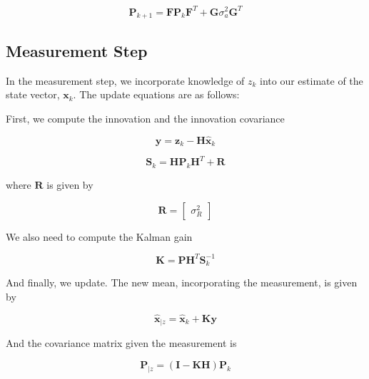 \documentclass{article}
\begin{document}
\begin{equation}
\mathbf{P}_{k+1} = \mathbf{F} \mathbf{P}_k \mathbf{F}^T + \mathbf{G} \sigma_a^2 \mathbf{G}^T
\end{equation}

\subsection{Measurement Step}

In the measurement step, we incorporate knowledge of $z_k$ into our estimate of the state vector, $\mathbf{x}_k$.
The update equations are as follows:

First, we compute the innovation and the innovation covariance

\begin{equation}
\mathbf{y} = \mathbf{z}_k - \mathbf{H}\hat{\mathbf{x}}_k
\end{equation}

\begin{equation}
\mathbf{S}_k = \mathbf{H}\mathbf{P}_k\mathbf{H}^T + \mathbf{R}
\end{equation}

where $\mathbf{R}$ is given by

\[
\mathbf{R} =
\begin{bmatrix}
\sigma_R^2
\end{bmatrix}
\]

We also need to compute the Kalman gain

\begin{equation}
\mathbf{K} = \mathbf{P}\mathbf{H}^T\mathbf{S}_k^{-1}
\end{equation}

And finally, we update. The new mean, incorporating the measurement, is given by

\begin{equation}
\hat{\mathbf{x}}_{|z} = \hat{\mathbf{x}}_k + \mathbf{K} \mathbf{y}
\end{equation}

And the covariance matrix given the measurement is

\begin{equation}
\mathbf{P}_{|z} = (\mathbf{I} - \mathbf{K}\mathbf{H})\mathbf{P}_k
\end{equation}
\end{document}
